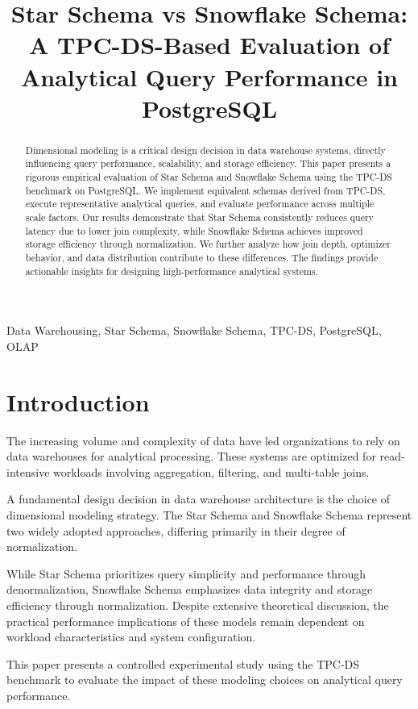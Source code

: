 \documentclass[conference]{IEEEtran}
\title{Star Schema vs Snowflake Schema: A TPC-DS-Based Evaluation of Analytical Query Performance in PostgreSQL}
\author{
\IEEEauthorblockN{Marcelo Martche}
\IEEEauthorblockA{Instituto Politécnico de Viseu\\
MSc in Information Systems\\
Email: your@email.com}
}
\begin{document}
\maketitle

\begin{abstract}
Dimensional modeling is a critical design decision in data warehouse systems, directly influencing query performance, scalability, and storage efficiency. This paper presents a rigorous empirical evaluation of Star Schema and Snowflake Schema using the TPC-DS benchmark on PostgreSQL. We implement equivalent schemas derived from TPC-DS, execute representative analytical queries, and evaluate performance across multiple scale factors. Our results demonstrate that Star Schema consistently reduces query latency due to lower join complexity, while Snowflake Schema achieves improved storage efficiency through normalization. We further analyze how join depth, optimizer behavior, and data distribution contribute to these differences. The findings provide actionable insights for designing high-performance analytical systems.
\end{abstract}

\begin{IEEEkeywords}
Data Warehousing, Star Schema, Snowflake Schema, TPC-DS, PostgreSQL, OLAP
\end{IEEEkeywords}

\section{Introduction}

The increasing volume and complexity of data have led organizations to rely on data warehouses for analytical processing. These systems are optimized for read-intensive workloads involving aggregation, filtering, and multi-table joins.

A fundamental design decision in data warehouse architecture is the choice of dimensional modeling strategy. The Star Schema and Snowflake Schema represent two widely adopted approaches, differing primarily in their degree of normalization.

While Star Schema prioritizes query simplicity and performance through denormalization, Snowflake Schema emphasizes data integrity and storage efficiency through normalization. Despite extensive theoretical discussion, the practical performance implications of these models remain dependent on workload characteristics and system configuration.

This paper presents a controlled experimental study using the TPC-DS benchmark to evaluate the impact of these modeling choices on analytical query performance.
\end{document}
